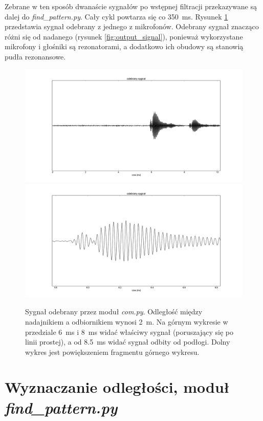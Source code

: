 Zebrane w ten sposób dwanaście sygnałów po wstępnej filtracji przekazywane są dalej do \textit{find\_pattern.py}. Cały cykl powtarza 
się co \SI{350}{ms}.
Rysunek \ref{fig:com_output_2m} przedstawia sygnał odebrany z jednego z mikrofonów.
Odebrany sygnał znacząco różni się od nadanego (rysunek \ref{fig:output_signal}),
ponieważ wykorzystane mikrofony i głośniki są rezonatorami, a dodatkowo 
ich obudowy są stanowią pudła rezonansowe.


\begin{figure}[p]
    \centering
    \includegraphics[width=1.0\textwidth, trim= 50mm 0mm 40mm 0mm,clip]{com_output_2m_1}
    \includegraphics[width=1.0\textwidth, trim= 50mm 0mm 40mm 0mm,clip]{com_output_2m_2}
    \caption{Sygnał odebrany przez moduł \textit{com.py}. 
    Odległość między nadajnikiem a odbiornikiem wynosi \SI{2}{m}.
    Na górnym wykresie w przedziale \SI{6}{ms} i \SI{8}{ms} widać właściwy sygnał (poruszający się po linii prostej), a od \SI{8.5}{ms}
   widać sygnał odbity od podłogi. 
    Dolny wykres jest powiększeniem fragmentu górnego wykresu.}
    \label{fig:com_output_2m}
\end{figure}

\section{Wyznaczanie odległości, moduł \textit{find\_pattern.py}}

